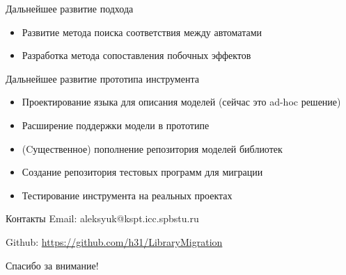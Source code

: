 \documentclass[12pt]{beamer}
\begin{document}
{
\begin{frame}{Дальнейшее развитие подхода}
	\begin{mybox}[]
	\begin{itemize}	
		\item Развитие метода поиска соответствия между автоматами
		\item Разработка метода сопоставления побочных эффектов
	\end{itemize}
	\end{mybox}
\end{frame}
}

{
\begin{frame}{Дальнейшее развитие прототипа инструмента}
	\begin{mybox}[]
	\begin{itemize}
		\item Проектирование языка для описания моделей (сейчас это ad-hoc решение)
		\item Расширение поддержки модели в прототипе
		\item (Cущественное) пополнение репозитория моделей библиотек
		\item Создание репозитория тестовых программ для миграции
		\item Тестирование инструмента на реальных проектах
	\end{itemize}
	\end{mybox}
\end{frame}
}

\begin{frame}[t]{Контакты}
	Email: aleksyuk@kspt.icc.spbstu.ru
	
	Github: \url{https://github.com/h31/LibraryMigration}
	
	\vspace{1cm}
	\begin{center}
		\Large
		Спасибо за внимание!
	\end{center}
\end{frame}
\end{document}
